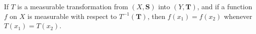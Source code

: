 If $T$ is a measurable transformation from $(X, \mathbf{S})$ into $(Y, \mathbf{T})$, and if a function $f$ on $X$ is measurable with respect to $T^{-1}(\mathbf{T})$, then $f(x_1) = f(x_2)$ whenever $T(x_1) = T(x_2)$.
